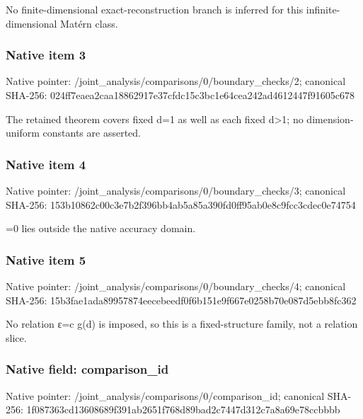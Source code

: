 \documentclass[10pt,a4paper]{article}
\begin{document}
\begingroup\raggedright\sloppy No finite-dimensional exact-reconstruction branch is inferred for this infinite-dimensional Mat{\AtlasUnicodeText é}\allowbreak{}rn class.\par\endgroup

\subsubsection{Native item 3}
Native pointer: /joint\_\allowbreak{}analysis/comparisons/0/boundary\_\allowbreak{}checks/2; canonical SHA-256: 024ff7eaea2caa18862917e37cfdc15c3bc1e64cea242ad4612447f91605c678

\begingroup\raggedright\sloppy The retained theorem covers fixed d=\allowbreak{}1 as well as each fixed d>1;\allowbreak{} no dimension-uniform constants are asserted.\par\endgroup

\subsubsection{Native item 4}
Native pointer: /joint\_\allowbreak{}analysis/comparisons/0/boundary\_\allowbreak{}checks/3; canonical SHA-256: 153b10862c00c3e7b2f396bb4ab5a85a390fd0ff95ab0e8c9fcc3cdec0e74754

\begingroup\raggedright{}\allowbreak{}=\allowbreak{}0 lies outside the native accuracy domain.\par\endgroup

\subsubsection{Native item 5}
Native pointer: /joint\_\allowbreak{}analysis/comparisons/0/boundary\_\allowbreak{}checks/4; canonical SHA-256: 15b3fae1ada89957874eecebeedf0f6b151e9f667e0258b70e087d5ebb8fc362

\begingroup\raggedright\sloppy No relation {\AtlasUnicodeText ε}\allowbreak{}=\allowbreak{}c g(d) is imposed,\allowbreak{} so this is a fixed-structure family,\allowbreak{} not a relation slice.\par\endgroup

\subsubsection{Native field: comparison\_\allowbreak{}id}
Native pointer: /joint\_\allowbreak{}analysis/comparisons/0/comparison\_\allowbreak{}id; canonical SHA-256: 1f087363cd13608689f391ab2651f768d89bad2c7447d312c7a8a69e78ccbbbb
\end{document}

